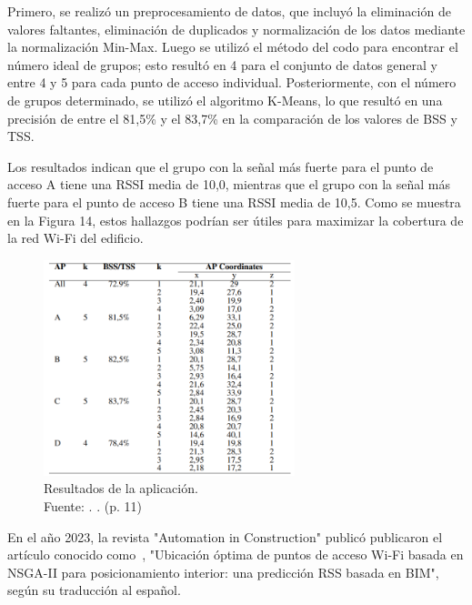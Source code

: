 Primero, se realizó un preprocesamiento de datos, que incluyó la eliminación de valores faltantes, eliminación de duplicados y normalización de los datos mediante la normalización Min-Max.  Luego se utilizó el método del codo para encontrar el número ideal de grupos; esto resultó en 4 para el conjunto de datos general y entre 4 y 5 para cada punto de acceso individual.  Posteriormente, con el número de grupos determinado, se utilizó el algoritmo K-Means, lo que resultó en una precisión de entre el 81,5\% y el 83,7\% en la comparación de los valores de BSS y TSS.

Los resultados indican que el grupo con la señal más fuerte para el punto de acceso A tiene una RSSI media de 10,0, mientras que el grupo con la señal más fuerte para el punto de acceso B tiene una RSSI media de 10,5.  Como se muestra en la Figura 14, estos hallazgos podrían ser útiles para maximizar la cobertura de la red Wi-Fi del edificio.

\begin{figure}[!ht]
	\begin{center}
		\includegraphics[width=0.65\textwidth]{2/figures/ainun2022.png}
		\caption[Resultados de la aplicación]{Resultados de la aplicación.\\
			Fuente: \cite{pr_ainun2022optikmeans}. . (p. 11)}
		\label{2:fig122}
	\end{center}
\end{figure}

\clearpage
En el año 2023, la revista "Automation in Construction" publicó \cite{pr_hosseini2023NSGAIIap} publicaron el artículo conocido como , "Ubicación óptima de puntos de acceso Wi-Fi basada en NSGA-II para posicionamiento interior: una predicción RSS basada en BIM", según su traducción al español.

